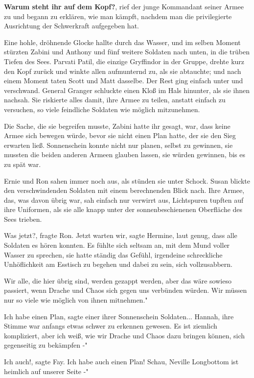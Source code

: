 \glqq \textbf{Warum steht ihr auf dem Kopf?}\grqq{}, rief der junge Kommandant
seiner Armee zu und begann zu erklären, wie man kämpft, nachdem man die
privilegierte Ausrichtung der Schwerkraft aufgegeben hat.

Eine hohle, dröhnende Glocke hallte durch das Wasser, und im selben Moment
stürzten Zabini und Anthony und fünf weitere Soldaten nach unten, in die trüben
Tiefen des Sees. Parvati Patil, die einzige Gryffindor in der Gruppe, drehte
kurz den Kopf zurück und winkte allen aufmunternd zu, als sie abtauchte; und
nach einem Moment taten Scott und Matt dasselbe. Der Rest ging einfach unter und
verschwand. General Granger schluckte einen Kloß im Hals hinunter, als sie ihnen
nachsah. Sie riskierte alles damit, ihre Armee zu teilen, anstatt einfach zu
versuchen, so viele feindliche Soldaten wie möglich mitzunehmen.

Die Sache, die sie begreifen musste, Zabini hatte ihr gesagt, war, dass keine
Armee sich bewegen würde, bevor sie nicht einen Plan hatte, der sie den Sieg
erwarten ließ. Sonnenschein konnte nicht nur planen, selbst zu gewinnen, sie
mussten die beiden anderen Armeen glauben lassen, sie würden gewinnen, bis es zu
spät war.

Ernie und Ron sahen immer noch aus, als stünden sie unter Schock. Susan blickte
den verschwindenden Soldaten mit einem berechnenden Blick nach. Ihre Armee, das,
was davon übrig war, sah einfach nur verwirrt aus, Lichtspuren tupften auf ihre
Uniformen, als sie alle knapp unter der sonnenbeschienenen Oberfläche des Sees
trieben.

\glqq Was jetzt?\grqq{}, fragte Ron. \glqq Jetzt warten wir\grqq{}, sagte
Hermine, laut genug, dass alle Soldaten es hören konnten. Es fühlte sich seltsam
an, mit dem Mund voller Wasser zu sprechen, sie hatte ständig das Gefühl,
irgendeine schreckliche Unhöflichkeit am Esstisch zu begehen und dabei zu sein,
sich vollzusabbern.

\glqq Wir alle, die hier übrig sind, werden gezappt werden, aber das wäre
sowieso passiert, wenn Drache und Chaos sich gegen uns verbünden würden. Wir
müssen nur so viele wie möglich von ihnen mitnehmen."

\glqq Ich habe einen Plan\grqq{}, sagte einer ihrer Sonnenschein Soldaten...
Hannah, ihre Stimme war anfangs etwas schwer zu erkennen gewesen. \glqq Es ist
ziemlich kompliziert, aber ich weiß, wie wir Drache und Chaos dazu bringen
können, sich gegenseitig zu bekämpfen -"

\glqq Ich auch!\grqq{}, sagte Fay. \glqq Ich habe auch einen Plan! Schau,
Neville Longbottom ist heimlich auf unserer Seite -"

